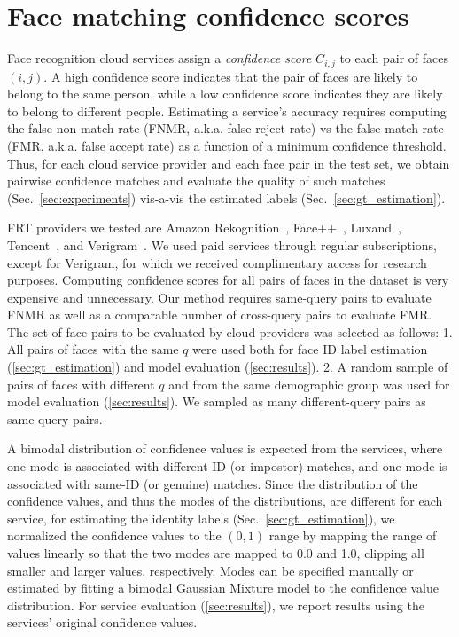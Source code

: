 \documentclass[10pt,twocolumn,letterpaper]{article}
\begin{document}
\section{Face matching confidence scores}
\label{sec:face-comparison}

Face recognition cloud services assign a {\it confidence score} $C_{i,j}$ to each pair of faces $(i,j)$. A high confidence score indicates that the pair of faces are likely to belong to the same person, while a low confidence score indicates they are likely to belong to different people.  Estimating a service's accuracy requires computing the false non-match rate (FNMR, a.k.a. false reject rate) vs the false match rate (FMR, a.k.a. false accept rate) as a function of a minimum confidence threshold. Thus, for each cloud service provider and each face pair in the test set, we obtain pairwise confidence matches and evaluate the quality of such matches (Sec.~\ref{sec:experiments}) vis-a-vis the estimated labels (Sec.~\ref{sec:gt_estimation}).

FRT providers we tested are Amazon Rekognition~\cite{amazonRekognition}, Face++~\cite{face_plus_plus}, Luxand~\cite{luxand}, Tencent~\cite{tencent}, and Verigram~\cite{verigram}. We used paid services through regular subscriptions, except for Verigram, for which we received complimentary access for research purposes.
%
Computing confidence scores for all pairs of faces in the dataset is very expensive and unnecessary. Our method requires same-query pairs to evaluate FNMR as well as a comparable number of cross-query pairs to evaluate FMR. The set of face pairs to be evaluated by cloud providers was selected as follows:
1. All pairs of faces with the same $q$ were used both for face ID label estimation (\cref{sec:gt_estimation}) and model evaluation (\cref{sec:results}).
2. A random sample of pairs of faces with different $q$ and from the same demographic group was used for model evaluation (\cref{sec:results}). We sampled as many different-query pairs as same-query pairs.

A bimodal distribution of confidence values is expected from the services, where one mode is associated with different-ID (or impostor) matches, and one mode is associated with same-ID (or genuine) matches. Since the distribution of the confidence values, and thus the modes of the distributions, are different for each service, for estimating the identity labels (Sec.~\ref{sec:gt_estimation}), we normalized the confidence values to the $(0,1)$ range by mapping the range of values linearly so that the two modes are mapped to  0.0 and 1.0, clipping all smaller and larger values, respectively. Modes can be specified manually or estimated by fitting a bimodal Gaussian Mixture model to the confidence value distribution. For service evaluation (\cref{sec:results}), we report results using the services' original confidence values.
\end{document}
